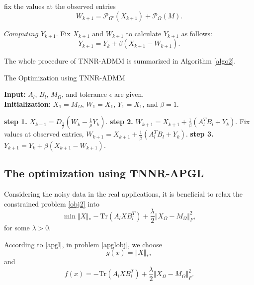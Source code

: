 \documentclass{article}
\begin{document}
{fix the values at the observed entries
\begin{equation}
	W_{k+1} = \mathcal{P}_{\Omega^c}(X_{k+1}) + \mathcal{P}_{\Omega}(M).
\end{equation}

$\textit{Computing}$  $Y_{k+1}$. Fix $X_{k+1}$ and $W_{k+1}$ to calculate $Y_{k+1}$ as follows:
\begin{equation}
	Y_{k+1} = Y_{k} + \beta(X_{k+1} - W_{k+1}).
\end{equation}

The whole procedure of TNNR-ADMM is summarized in Algorithm \ref{algo2}.


\begin{algorithm}[t]
	\caption{The Optimization using TNNR-ADMM}
	\label{algo2}
	\textbf{Input:} $A_l$, $B_l$, $M_{\Omega}$, and tolerance $\epsilon$ are given.\\
	\textbf{Initialization:} $X_1 = M_{\Omega}$, $W_1 = X_1$, $Y_1=X_1$, and $\beta = 1$. 
	\begin{algorithmic}
		\Repeat 
		\State \textbf{step 1.} $X_{k+1} = D_{\frac{1}{\rho}}(W_k - \frac{1}{\rho}Y_k)$.
		\State \textbf{step 2.} $W_{k+1} = X_{k+1} + \frac{1}{\beta}(A_l^TB_l + Y_k)$.
		\State Fix values at observed entries, 
		$W_{k+1} = X_{k+1} + \frac{1}{\beta}(A_l^TB_l + Y_k)$.
		\State \textbf{step 3.} $Y_{k+1} = Y_{k} + \beta(X_{k+1} - W_{k+1})$.
	\end{algorithmic}
\end{algorithm}

\subsection{The optimization using TNNR-APGL}
Considering the noisy data in the real applications, it is beneficial to relax the constrained problem \eqref{obj2} into
\begin{equation}
	\label{apglobj}
	\min \Vert X\Vert_* - \text{Tr}(A_lXB_l^T) + \frac{\lambda}{2}\Vert X_\Omega - M_\Omega \Vert^2_F,
\end{equation}
for some $\lambda >0$.

According to \eqref{apgl}, in problem \eqref{apglobj}, we choose
\begin{equation*}
	g(x) = \Vert X\Vert_*,
\end{equation*}
and
\begin{equation*}
	f(x) = - \text{Tr}(A_lXB_l^T) + \frac{\lambda}{2}\Vert X_\Omega - M_\Omega \Vert^2_F.
\end{equation*}

}
\end{document}
